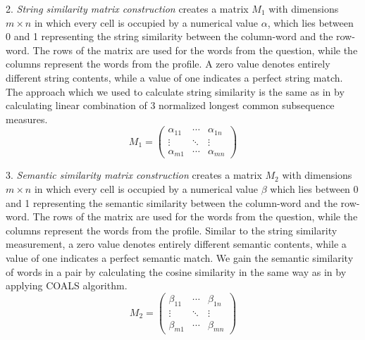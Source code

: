 \documentclass[conference]{IEEEtran}
\begin{document}
\vspace{-0.3cm}    
2. {\it String similarity matrix construction} creates a matrix $M_1$ with dimensions $m\times n$ in which every cell is occupied by a numerical value $\alpha$, which lies between 0 and 1 representing the string similarity between the column-word and the row-word. The rows of the matrix are used for the words from the question, while the columns represent the words from the profile. A zero value denotes entirely different string contents, while a value of one indicates a perfect string match. The approach which we used to calculate string similarity is the same as in \cite{bib:LinSTSS} by calculating linear combination of 3 normalized longest common subsequence measures.
\begin{equation}
	\label{eq:m1}
	M_1 = 
\left( 
	\begin{array}{ccc}
		\alpha_{11} & \cdots & \alpha_{1n} \\
		\vdots & \ddots & \vdots \\
		\alpha_{m1} & \cdots & \alpha_{mn} 
	\end{array} 
\right)
\end{equation}

3. {\it Semantic similarity matrix construction} creates a matrix $M_2$ with dimensions $m\times n$ in which every cell is occupied by a numerical value $\beta$ which lies between 0 and 1 representing the semantic similarity between the column-word and the row-word. The rows of the matrix are used for the words from the question, while the columns represent the words from the profile. Similar to the string similarity measurement, a zero value denotes entirely different semantic contents, while a value of one indicates a perfect semantic match. We gain the semantic similarity of words in a pair by calculating the cosine similarity in the same way as in \cite{bib:LinSTSS} by applying COALS algorithm.
\begin{equation}
	\label{eq:m2}
	M_2 = 
\left( 
	\begin{array}{ccc}
		\beta_{11} & \cdots & \beta_{1n} \\
		\vdots & \ddots & \vdots \\
		\beta_{m1} & \cdots & \beta_{mn} 
	\end{array} 
\right)
\end{equation}
\end{document}
